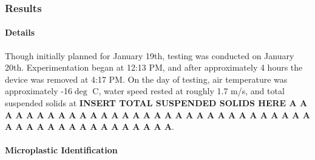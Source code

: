\documentclass[fleqn,10pt]{SelfArx} %
\begin{document}
	\subsubsection{Results}
	\paragraph*{Details}
	Though initially planned for January 19th, testing was conducted on January 20th. Experimentation began at 12:13 PM, and after approximately 4 hours the device was removed at 4:17 PM. On the day of testing, air temperature was approximately -16$\deg$ C, water speed rested at roughly 1.7 m/s, and total suspended solids at \textbf{INSERT TOTAL SUSPENDED SOLIDS HERE A A A A A A A A A A A A A A A A A A A A A A A A A A A A A A  A A A A A A A A A A A A A A A A A}.
	\paragraph{Microplastic Identification}
	
\end{document}
